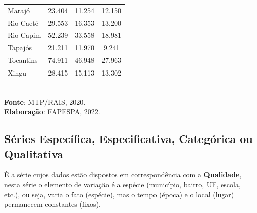 \begin{table}[!htb]
{\begin{tabular}{l|c|c|c}
Marajó                     &  23.404                                    &  11.254                       &   12.150                           \\
Rio Caeté                  &  29.553                                    &  16.353                       &   13.200                           \\
Rio Capim                  &  52.239                                    &  33.558                       &   18.981                           \\
Tapajós                    &  21.211                                    &  11.970                       &   9.241                           \\
Tocantins                  &  74.911                                    &  46.948                       &   27.963                           \\
Xingu                      &  28.415                                    &  15.113                       &   13.302                           \\ \hline\hline
\end{tabular}}
\\ 
\hspace{-6.9cm}
\textbf{Fonte}: MTP/RAIS, 2020. \\
\hspace{-6.2cm}
\textbf{Elaboração}: FAPESPA, 2022.
\end{table}





















\newpage
\subsection{Séries Específica, Especificativa, Categórica ou Qualitativa}

\inic È a série cujos dados estão dispostos em correspondência com a \textbf{Qualidade}, nesta série o elemento de variação é a espécie (município, bairro, UF, escola, etc.), ou seja, varia o fato (espécie), mas o tempo (época) e o local (lugar) permanecem constantes (fixos).


